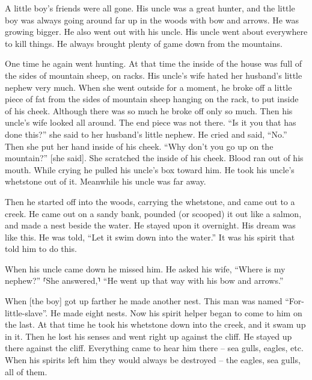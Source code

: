 A little boy’s friends were all gone.
His uncle was a great hunter, and the little boy was always going around far up in the woods with bow and arrows.
He was growing bigger.
He also went out with his uncle.
His uncle went about everywhere to kill things.
He always brought plenty of game down from the mountains.

One time he again went hunting.
At that time the inside of the house was full of the sides of mountain sheep, on racks.
His uncle’s wife hated her husband’s little nephew very much.
When she went outside for a moment, he broke off a little piece of fat from the sides of mountain sheep hanging on the rack, to put inside of his cheek.
Although there was so much he broke off only so much.
Then his uncle’s wife looked all around.
The end piece was not there.
“Is it you that has done this?”
she said to her husband’s little nephew.
He cried and said, “No.”
Then she put her hand inside of his cheek.
“Why don’t you go up on the mountain?” [she said].
She scratched the inside of his cheek.
Blood ran out of his mouth.
While crying he pulled his uncle’s box toward him.
He took his uncle’s whetstone out of it.
Meanwhile his uncle was far away.

Then he started off into the woods,
carrying the whetstone,
and came out to a creek.
He came out on a sandy bank,
pounded (or scooped) it out like a salmon,
and made a nest beside the water.
He stayed upon it overnight.
His dream was like this.
He was told, “Let it swim down into the water.”
It was his spirit that told him to do this.

When his uncle came down he missed him.
He asked his wife, “Where is my nephew?”
⸢She answered,⸣ “He went up that way with his bow and arrows.”

When [the boy] got up farther he made another nest.
This man was named “For-little-slave”.
He made eight nests.
Now his spirit helper began to come to him on the last.
At that time he took his whetstone down into the creek,
and it swam up in it.
Then he lost his senses and went right up against the cliff.
He stayed up there against the cliff.
Everything came to hear him there – sea gulls, eagles, etc.
When his spirits left him they would always be destroyed – the eagles, sea gulls, all of them.

